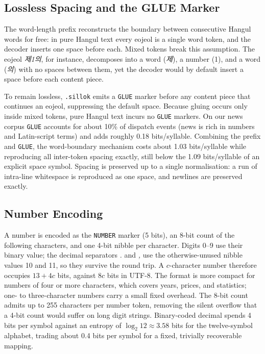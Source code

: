 \documentclass[conference]{IEEEtran}
\begin{document}
\subsection{Lossless Spacing and the GLUE Marker}

The word-length prefix reconstructs the boundary between consecutive Hangul
words for free: in pure Hangul text every eojeol is a single word token, and the
decoder inserts one space before each. Mixed tokens break this assumption. The
eojeol \emph{제1의}, for instance, decomposes into a word (\emph{제}), a number
(1), and a word (\emph{의}) with no spaces between them, yet the decoder would by
default insert a space before each content piece.

To remain lossless, \texttt{.sillok} emits a \texttt{GLUE} marker before any
content piece that continues an eojeol, suppressing the default space. Because
gluing occurs only inside mixed tokens, pure Hangul text incurs no \texttt{GLUE}
markers. On our news corpus \texttt{GLUE} accounts for about 10\% of dispatch
events (news is rich in numbers and Latin-script terms) and adds roughly 0.18
bits/syllable. Combining the prefix and \texttt{GLUE}, the word-boundary
mechanism costs about 1.03 bits/syllable while reproducing all inter-token
spacing exactly, still below the 1.09 bits/syllable of an explicit space symbol.
Spacing is preserved up to a single normalisation: a run of intra-line
whitespace is reproduced as one space, and newlines are preserved exactly.

\subsection{Number Encoding}

A number is encoded as the \texttt{NUMBER} marker (5 bits), an 8-bit count of the
following characters, and one 4-bit nibble per character. Digits 0--9 use their
binary value; the decimal separators \emph{.} and \emph{,} use the
otherwise-unused nibble values 10 and 11, so they survive the round trip. A
$c$-character number therefore occupies $13 + 4c$ bits, against $8c$ bits in
UTF-8. The format is more compact for numbers of four or more characters, which
covers years, prices, and statistics; one- to three-character numbers carry a
small fixed overhead. The 8-bit count admits up to 255 characters per number
token, removing the silent overflow that a 4-bit count would suffer on long
digit strings. Binary-coded decimal spends 4 bits per symbol against an entropy
of $\log_2 12 \approx 3.58$ bits for the twelve-symbol alphabet, trading about
0.4 bits per symbol for a fixed, trivially recoverable mapping.
\end{document}
